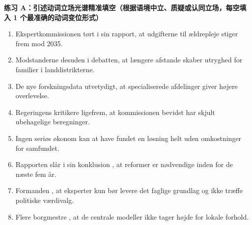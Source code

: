 \textbf{练习 A：引述动词立场光谱精准填空（根据语境中立、质疑或认同立场，每空填入 1 个最准确的动词变位形式）}
\begin{enumerate}
  \item Ekspertkommissionen \underline{\hspace{2.2cm}} tørt i sin rapport, at udgifterne til ældrepleje stiger frem mod 2035.
  \item Modstanderne \underline{\hspace{2.2cm}} desuden i debatten, at længere afstande skaber utryghed for familier i landdistrikterne.
  \item De nye forskningsdata \underline{\hspace{2.2cm}} utvetydigt, at specialiserede afdelinger giver højere overlevelse.
  \item Regeringens kritikere \underline{\hspace{2.2cm}} ligefrem, at kommissionen bevidst har skjult ubehagelige beregninger.
  \item Ingen seriøs økonom kan \underline{\hspace{2.2cm}} at have fundet en løsning helt uden omkostninger for samfundet.
  \item Rapporten slår i sin konklusion \underline{\hspace{2.2cm}}, at reformer er nødvendige inden for de næste fem år.
  \item Formanden \underline{\hspace{2.2cm}}, at eksperter kun bør levere det faglige grundlag og ikke træffe politiske værdivalg.
  \item Flere borgmestre \underline{\hspace{2.2cm}}, at de centrale modeller ikke tager højde for lokale forhold.
\end{enumerate}

